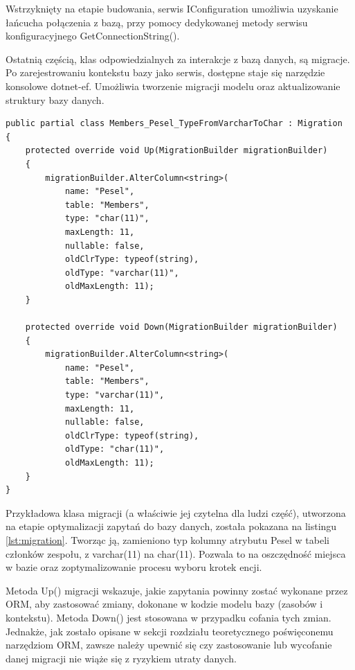 Wstrzyknięty na etapie budowania, serwis IConfiguration umożliwia uzyskanie łańcucha połączenia z bazą, przy pomocy dedykowanej metody serwisu konfiguracyjnego GetConnectionString().

Ostatnią częścią, klas odpowiedzialnych za interakcje z bazą danych, są migracje. Po zarejestrowaniu kontekstu bazy jako serwis, dostępne staje się narzędzie konsolowe dotnet-ef. Umożliwia tworzenie migracji modelu oraz aktualizowanie struktury bazy danych.

\begin{lstlisting}[language=CSharp, caption=Przykładowa klasa migracji Entity Framework Core, label=lst:migration]
public partial class Members_Pesel_TypeFromVarcharToChar : Migration
{
    protected override void Up(MigrationBuilder migrationBuilder)
    {
        migrationBuilder.AlterColumn<string>(
            name: "Pesel",
            table: "Members",
            type: "char(11)",
            maxLength: 11,
            nullable: false,
            oldClrType: typeof(string),
            oldType: "varchar(11)",
            oldMaxLength: 11);
    }

    protected override void Down(MigrationBuilder migrationBuilder)
    {
        migrationBuilder.AlterColumn<string>(
            name: "Pesel",
            table: "Members",
            type: "varchar(11)",
            maxLength: 11,
            nullable: false,
            oldClrType: typeof(string),
            oldType: "char(11)",
            oldMaxLength: 11);
    }
}
\end{lstlisting}

Przykładowa klasa migracji (a właściwie jej czytelna dla ludzi część), utworzona na etapie optymalizacji zapytań do bazy danych, została pokazana na listingu \ref{lst:migration}. Tworząc ją, zamieniono typ kolumny atrybutu Pesel w tabeli członków zespołu, z varchar(11) na char(11). Pozwala to na oszczędność miejsca w bazie oraz zoptymalizowanie procesu wyboru krotek encji.

Metoda Up() migracji wskazuje, jakie zapytania powinny zostać wykonane przez ORM, aby zastosować zmiany, dokonane w kodzie modelu bazy (zasobów i kontekstu). Metoda Down() jest stosowana w przypadku cofania tych zmian. Jednakże, jak zostało opisane w sekcji rozdziału teoretycznego poświęconemu narzędziom ORM, zawsze należy upewnić się czy zastosowanie lub wycofanie danej migracji nie wiąże się z ryzykiem utraty danych.


